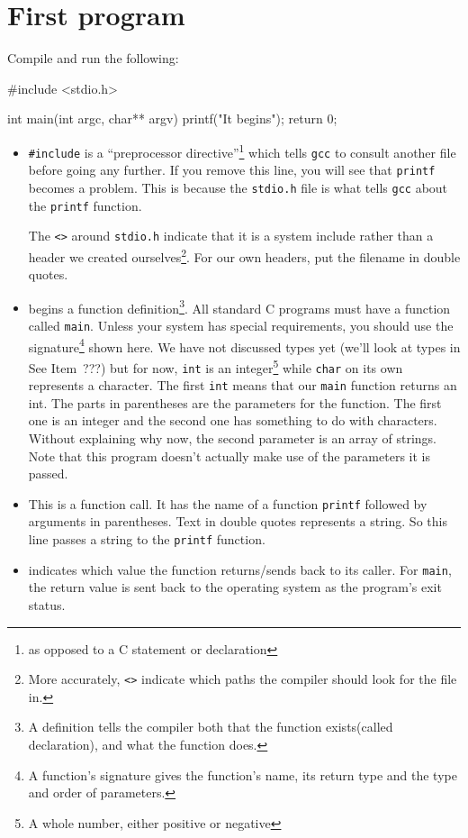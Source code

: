 
\chapter{First program}



Compile and run the following:
\begin{codeblock}
#include <stdio.h>

int main(int argc, char** argv) {
    printf("It begins\n");
    return 0;
}
\end{codeblock}

\begin{itemize}
 \item[1] \lstinline!#include! is a ``preprocessor directive''\footnote{as opposed to a C statement or declaration} which tells \texttt{gcc} to 
 consult another file before going any further.  If you remove this line, you will see that \texttt{printf} becomes a problem.
 This is because the \texttt{stdio.h} file is what tells \texttt{gcc} about the \texttt{printf} function.
 
 The \texttt{<>} around \texttt{stdio.h} indicate that it is a system include rather than a header we created ourselves\footnote{
 More accurately, \texttt{<>} indicate which paths the compiler should look for the file in.}.
 For our own headers, put the filename in double quotes.
 
 \item[3] begins a function definition\footnote{A definition tells the compiler both that the function exists(called declaration), and what the function does.}.
 All standard C programs must have a function called \texttt{main}.
 Unless your system has special requirements, you should use the signature\footnote{A function's signature gives the function's name, its return type and the type and order of parameters.} shown here.
 We have not discussed types yet (we'll look at types in See Item~???) but for now, \texttt{int} is an 
 integer\footnote{A whole number, either positive or negative} while \texttt{char} on its own represents a character.
 The first \texttt{int} means that our \texttt{main} function returns an int.
 The parts in parentheses are the parameters for the function.
 The first one is an integer and the second one has something to do with characters.
 Without explaining why now, the second parameter is an array of strings.
 Note that this program doesn't actually make use of the parameters it is passed.
 
 \item[4] This is a function call. It has the name of a function \texttt{printf} followed by arguments in parentheses.
 Text in double quotes represents a string. 
 So this line passes a string to the \texttt{printf} function.
 
 \item[5] indicates which value the function returns/sends back to its caller.
 For \texttt{main}, the return value is sent back to the operating system as the program's exit status.
\end{itemize}

